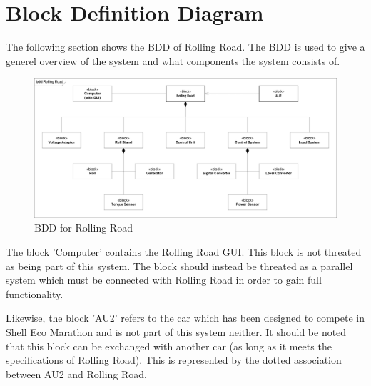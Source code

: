 \section{Block Definition Diagram}
The following section shows the BDD of Rolling Road. The BDD is used to give a generel overview of the system and what components the system consists of. 

\begin{figure}[H]
	\centering
	\includegraphics[width=1\linewidth]{Architecture/Diagrams/BDD_RR}
	\caption{BDD for Rolling Road}
	\label{fig:RR_BDD}
\end{figure}

The block 'Computer' contains the Rolling Road GUI. This block is not threated as being part of this system. The block should instead be threated as a parallel system which must be connected with Rolling Road in order to gain full functionality.

Likewise, the block 'AU2' refers to the car which has been designed to compete in Shell Eco Marathon and is not part of this system neither. It should be noted that this block can be exchanged with another car (as long as it meets the specifications of Rolling Road). This is represented by the dotted association between AU2 and Rolling Road.